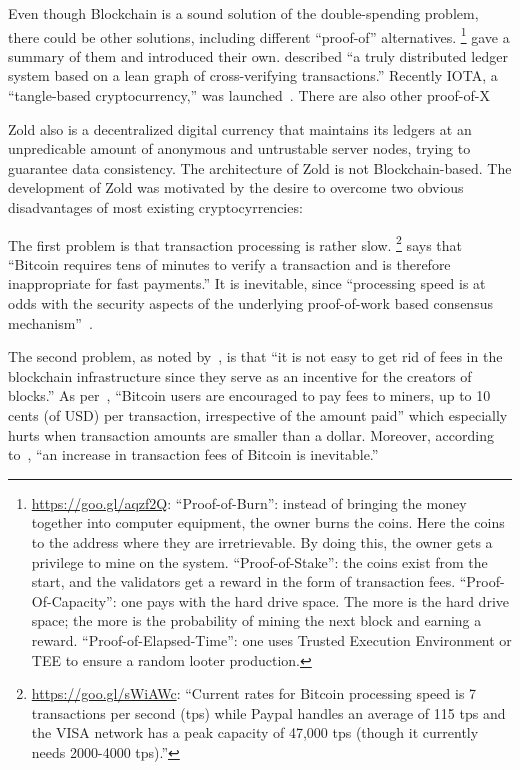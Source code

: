 \documentclass[11pt,oneside]{article}
\begin{document}
Even though Blockchain is a sound solution of the double-spending
problem, there could be other solutions,
including different ``proof-of'' alternatives.%
\footnote{%
  \url{https://goo.gl/aqzf2Q}:
  ``Proof-of-Burn'': instead of bringing the money together into computer equipment,
  the owner burns the coins. Here the coins to the address where they are
  irretrievable. By doing this, the owner gets a privilege to
  mine on the system.
  ``Proof-of-Stake'': the coins exist from the start, and
  the validators get a reward in the form of transaction fees.
  ``Proof-Of-Capacity'': one pays with the hard drive space. The more
  is the hard drive space; the more is the probability of mining
  the next block and earning a reward.
  ``Proof-of-Elapsed-Time'': one uses Trusted Execution Environment or TEE
  to ensure a random looter production.
}
\textcite{everaere2010} gave
a summary of them and introduced their own.
\textcite{boyen2016} described
``a truly distributed ledger system based on a lean graph of cross-verifying transactions.''
Recently IOTA, a ``tangle-based cryptocurrency,'' was launched~\parencite{popov2017}.
There are also other proof-of-X

Zold also is a decentralized digital currency that maintains its ledgers
at an unpredicable amount of anonymous and untrustable server nodes, trying to guarantee
data consistency. The architecture of Zold is not Blockchain-based.
The development of Zold was motivated by the desire to overcome
two obvious disadvantages of most existing cryptocyrrencies:

The first problem is that transaction processing is rather slow.%
\footnote{%
  \url{https://goo.gl/sWiAWc}:
  ``Current rates for Bitcoin processing
  speed is 7 transactions per second (tps) while Paypal handles
  an average of 115 tps and the VISA
  network has a peak capacity of 47,000 tps (though it currently needs 2000-4000 tps).''
}
\textcite{karame2012} says that ``Bitcoin requires tens of minutes to verify a transaction
and is therefore inappropriate for fast payments.''
It is inevitable, since
``processing speed is at odds with the security aspects of the underlying
proof-of-work based consensus mechanism''~\parencite{kiayias2015}.

The second problem, as noted by~\textcite{popov2017}, is that ``it is not easy to get rid
of fees in the blockchain infrastructure since they serve
as an incentive for the creators of blocks.''
As per~\textcite{moser2015}, ``Bitcoin users are encouraged to
pay fees to miners, up to 10 cents (of USD) per transaction, irrespective of the
amount paid'' which especially hurts when transaction amounts are smaller than a dollar.
Moreover, according to~\textcite{kaskaloglu2014},
``an increase in transaction fees of Bitcoin is inevitable.''
\end{document}
